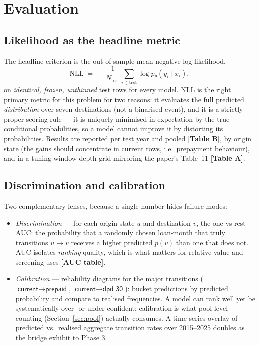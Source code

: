 \documentclass[11pt,a4paper]{article}
\newcommand{\state}[1]{\textsf{#1}}
\newcommand{\artifact}[1]{\textbf{[#1]}}
\begin{document}
\section{Evaluation}\label{sec:eval}

\subsection{Likelihood as the headline metric}

The headline criterion is the out-of-sample mean negative log-likelihood,
\begin{equation}
\label{eq:nll}
\mathrm{NLL} \;=\; -\frac{1}{N_{\mathrm{test}}} \sum_{i\in\mathrm{test}} \log p_\theta\!\left(y_i \mid x_i\right),
\end{equation}
on \emph{identical, frozen, unthinned} test rows for every model. NLL is the right primary metric for this problem for two reasons: it evaluates the full predicted \emph{distribution} over seven destinations (not a binarised event), and it is a strictly proper scoring rule --- it is uniquely minimised in expectation by the true conditional probabilities, so a model cannot improve it by distorting its probabilities. Results are reported per test year and pooled \artifact{Table B}, by origin state (the gains should concentrate in \state{current} rows, i.e.\ prepayment behaviour), and in a tuning-window depth grid mirroring the paper's Table~11 \artifact{Table A}.

\subsection{Discrimination and calibration}

Two complementary lenses, because a single number hides failure modes:
\begin{itemize}[itemsep=1pt]
\item \emph{Discrimination} --- for each origin state $u$ and destination $v$, the one-vs-rest AUC: the probability that a randomly chosen loan-month that truly transitions $u\to v$ receives a higher predicted $p(v)$ than one that does not. AUC isolates \emph{ranking} quality, which is what matters for relative-value and screening uses \artifact{AUC table}.
\item \emph{Calibration} --- reliability diagrams for the major transitions ($\state{current}\to\state{prepaid}$, $\state{current}\to\state{dpd\_30}$): bucket predictions by predicted probability and compare to realised frequencies. A model can rank well yet be systematically over- or under-confident; calibration is what pool-level counting (Section~\ref{sec:pool}) actually consumes. A time-series overlay of predicted vs.\ realised aggregate transition rates over 2015--2025 doubles as the bridge exhibit to Phase 3.
\end{itemize}
\end{document}
